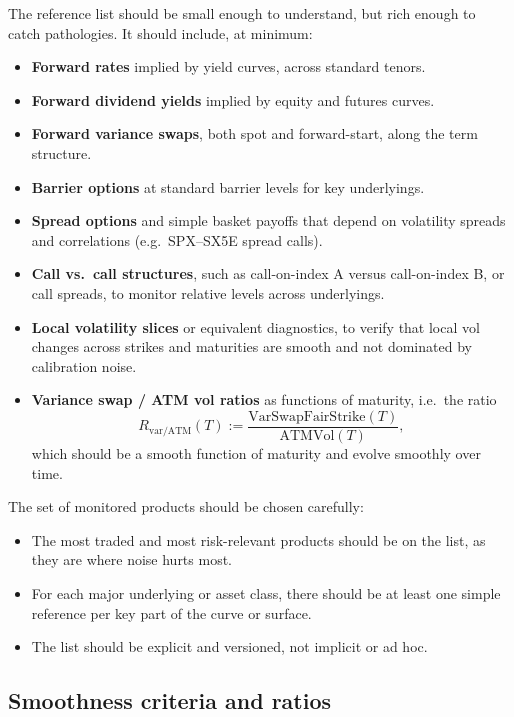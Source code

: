 \documentclass[11pt,a4paper]{article}
\begin{document}
The reference list should be small enough to understand, but rich enough to catch pathologies. It should include, at minimum:
\begin{itemize}
    \item \textbf{Forward rates} implied by yield curves, across standard tenors.
    \item \textbf{Forward dividend yields} implied by equity and futures curves.
    \item \textbf{Forward variance swaps}, both spot and forward-start, along the term structure.
    \item \textbf{Barrier options} at standard barrier levels for key underlyings.
    \item \textbf{Spread options} and simple basket payoffs that depend on volatility spreads and correlations (e.g.\ SPX--SX5E spread calls).
    \item \textbf{Call vs.\ call structures}, such as call-on-index A versus call-on-index B, or call spreads, to monitor relative levels across underlyings.
    \item \textbf{Local volatility slices} or equivalent diagnostics, to verify that local vol changes across strikes and maturities are smooth and not dominated by calibration noise.
    \item \textbf{Variance swap / ATM vol ratios} as functions of maturity, i.e.\ the ratio
    \[
        R_{\text{var/ATM}}(T) := \frac{\text{VarSwapFairStrike}(T)}{\text{ATMVol}(T)},
    \]
    which should be a smooth function of maturity and evolve smoothly over time.
\end{itemize}

The set of monitored products should be chosen carefully:
\begin{itemize}
    \item The most traded and most risk-relevant products should be on the list, as they are where noise hurts most.
    \item For each major underlying or asset class, there should be at least one simple reference per key part of the curve or surface.
    \item The list should be explicit and versioned, not implicit or ad hoc.
\end{itemize}

\subsection{Smoothness criteria and ratios}
\end{document}
